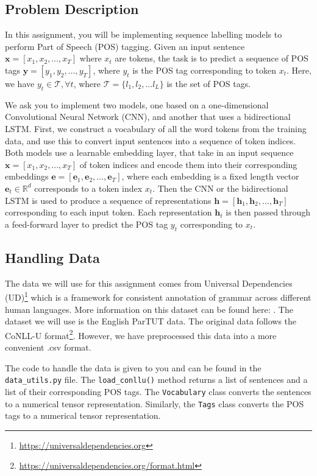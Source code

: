 \documentclass[11pt,addpoints,answers]{exam}
\newcommand{\Tc}{\mathcal{T}}
\newcommand{\Rb}{\mathbb{R}}
\newcommand{\ev}{\mathbf{e}}
\newcommand{\hv}{\mathbf{h}}
\newcommand{\xv}{\mathbf{x}}
\newcommand{\yv}{\mathbf{y}}
\begin{document}
\subsection{Problem Description}
\label{subsec:problem_description}

In this assignment, you will be implementing sequence labelling models to perform Part of Speech (POS) tagging. Given an input sentence $\xv = [x_1, x_2, \ldots, x_T]$ where $x_t$ are tokens, the task is to predict a sequence of POS tags $\yv = [y_1, y_2, \ldots, y_T]$, where $y_t$ is the POS tag corresponding to token $x_t$. Here, we have $y_t \in \Tc, \forall t$, where $\Tc = \{l_1, l_2, ... l_L\}$ is the set of POS tags.

We ask you to implement two models, one based on a one-dimensional Convolutional Neural Network (CNN), and another that uses a bidirectional LSTM. First, we construct a vocabulary of all the word tokens from the training data, and use this to convert input sentences into a sequence of token indices. Both models use a learnable embedding layer, that take in an input sequence $\xv = [x_1, x_2, ..., x_T]$ of token indices and encode them into their corresponding embeddings $\ev = [\ev_1, \ev_2, ..., \ev_T]$, where each embedding is a fixed length vector $\ev_t \in \Rb^d$ corresponds to a token index $x_t$. Then the CNN or the bidirectional LSTM is used to produce a sequence of representations $\hv = [\hv_1, \hv_2, \ldots, \hv_T]$ corresponding to each input token. Each representation $\hv_t$ is then passed through a feed-forward layer to predict the POS tag $y_t$ corresponding to $x_t$.

\subsection{Handling Data}
The data we will use for this assignment comes from Universal Dependencies (UD)\footnote{\url{https://universaldependencies.org}} which is a framework for consistent annotation of grammar across different human languages. More information on this dataset can be found here: . The dataset we will use is the English ParTUT data. The original data follows the CoNLL-U format\footnote{\url{https://universaldependencies.org/format.html}}. However, we have preprocessed this data into a more convenient .csv format.

The code to handle the data is given to you and can be found in the \lstinline{data_utils.py} file. The \lstinline{load_conllu()} method returns a list of sentences and a list of their corresponding POS tags. The \lstinline{Vocabulary} class  converts the sentences to a numerical tensor representation. Similarly, the \lstinline{Tags} class converts the POS tags to a numerical tensor representation.
\end{document}
